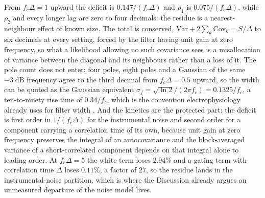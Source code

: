 \begin{appendixbox}
From $f_c\Delta=1$ upward the
deficit is $0.147/(f_c\Delta)$ and $\rho_1$ is $0.075/(f_c\Delta)$, while $\rho_2$ and every longer
lag are zero to four decimals: the residue is a nearest-neighbour effect of known size. The total is
conserved, $\mathrm{Var}+2\sum_k\mathrm{Cov}_k=S/\Delta$ to six decimals at every setting, forced by
the filter having unit gain at zero frequency, so what a likelihood allowing no such covariance sees
is a misallocation of variance between the diagonal and its neighbours rather than a loss of it. The
pole count does not enter: four poles, eight poles and a Gaussian of the same $-3\;\mathrm{dB}$
frequency agree to the third decimal from $f_c\Delta=0.5$ upward, so the width can be quoted as the
Gaussian equivalent $\sigma_f=\sqrt{\ln 2}/(2\pi f_c)=0.1325/f_c$, a ten-to-ninety rise time of
$0.34/f_c$, which is the convention electrophysiology already uses for filter width
\citep{colquhoun1995fitting}.
And the kinetics are the protected part: the deficit is first order in $1/(f_c\Delta)$
for the instrumental noise and second order for a component carrying a correlation time of its own,
because unit gain at zero frequency preserves the integral of an autocovariance and the
block-averaged variance of a short-correlated component depends on that integral alone to leading
order. At $f_c\Delta=5$ the white term loses $2.94\%$ and a gating term with correlation time
$\Delta$ loses $0.11\%$, a factor of $27$, so the residue lands in the instrumental-noise partition,
which is where the Discussion already argues an unmeasured departure of the noise model lives.


\end{appendixbox}

